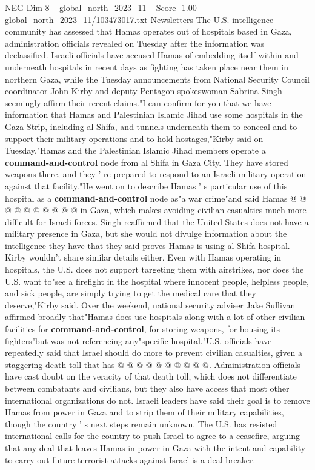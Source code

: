 \begin{textsample}{NEG Dim 8 – global\_north\_2023\_11 – Score -1.00 – global\_north\_2023\_11/103473017.txt}  \label{ex:f8_neg_334}
Newsletters The U.S. intelligence community has assessed that Hamas operates out of hospitals based in Gaza, administration officials revealed on Tuesday after the information was declassified.
Israeli officials have accused Hamas of embedding itself within and underneath hospitals in recent days as fighting has taken place near them in northern Gaza, while the Tuesday announcements from National Security Council coordinator John Kirby and deputy Pentagon spokeswoman Sabrina Singh seemingly affirm their recent claims."I can confirm for you that we have information that Hamas and Palestinian Islamic Jihad use some hospitals in the Gaza Strip, including al Shifa, and tunnels underneath them to conceal and to support their military operations and to hold hostages,"Kirby said on Tuesday."Hamas and the Palestinian Islamic Jihad members operate a \textbf{command-and-control} node from al Shifa in Gaza City.
They have stored weapons there, and they ' re prepared to respond to an Israeli military operation against that facility."He went on to describe Hamas ' s particular use of this hospital as a \textbf{command-and-control} node as"a war crime"and said Hamas @ @ @ @ @ @ @ @ @ @ in Gaza, which makes avoiding civilian casualties much more difficult for Israeli forces.
Singh reaffirmed that the United States does not have a military presence in Gaza, but she would not divulge information about the intelligence they have that they said proves Hamas is using al Shifa hospital.
Kirby wouldn't share similar details either.
Even with Hamas operating in hospitals, the U.S. does not support targeting them with airstrikes, nor does the U.S. want to"see a firefight in the hospital where innocent people, helpless people, and sick people, are simply trying to get the medical care that they deserve,"Kirby said.
Over the weekend, national security adviser Jake Sullivan affirmed broadly that"Hamas does use hospitals along with a lot of other civilian facilities for \textbf{command-and-control}, for storing weapons, for housing its fighters"but was not referencing any"specific hospital."U.S. officials have repeatedly said that Israel should do more to prevent civilian casualties, given a staggering death toll that has @ @ @ @ @ @ @ @ @ @.
Administration officials have cast doubt on the veracity of that death toll, which does not differentiate between combatants and civilians, but they also have access that most other international organizations do not.
Israeli leaders have said their goal is to remove Hamas from power in Gaza and to strip them of their military capabilities, though the country ' s next steps remain unknown.
The U.S. has resisted international calls for the country to push Israel to agree to a ceasefire, arguing that any deal that leaves Hamas in power in Gaza with the intent and capability to carry out future terrorist attacks against Israel is a deal-breaker.

\end{textsample}
